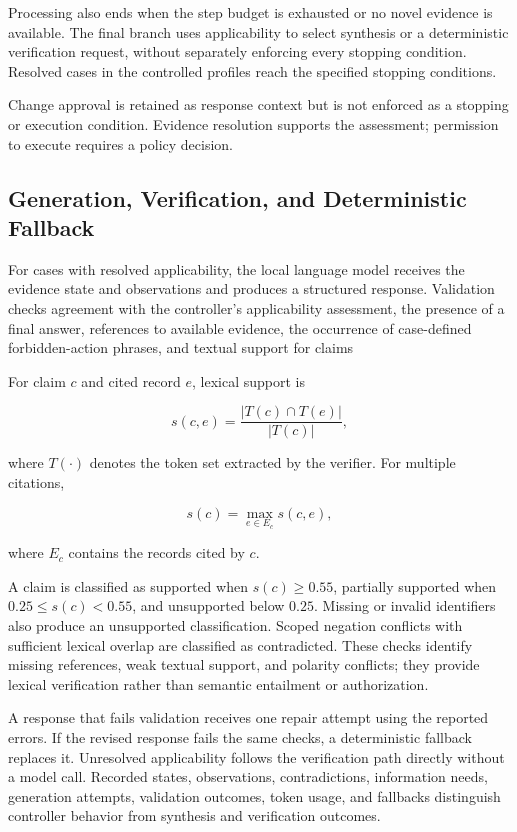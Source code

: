 \documentclass[conference]{IEEEtran}
\begin{document}
Processing also ends when the step budget is exhausted or no novel
evidence is available. The final branch uses applicability to select
synthesis or a deterministic verification request, without separately
enforcing every stopping condition. Resolved cases in the controlled
profiles reach the specified stopping conditions.

Change approval is retained as response context but is not enforced
as a stopping or execution condition. Evidence resolution supports
the assessment; permission to execute requires a policy decision.

\subsection{Generation, Verification, and Deterministic Fallback}

For cases with resolved applicability, the local language model receives the
evidence state and observations and produces a structured response. Validation checks agreement with the controller's applicability
assessment, the presence of a final answer, references to available
evidence, the occurrence of case-defined forbidden-action phrases,
and textual support for claims

For claim $c$ and cited record $e$, lexical support is

\begin{equation}
s(c,e)=
\frac{|T(c)\cap T(e)|}{|T(c)|},
\label{eq:overlap}
\end{equation}

where $T(\cdot)$ denotes the token set extracted by the verifier. For multiple citations,

\begin{equation}
s(c)=\max_{e\in E_c}s(c,e),
\label{eq:claimscore}
\end{equation}

where $E_c$ contains the records cited by $c$.

A claim is classified as supported when $s(c)\geq 0.55$, partially
supported when $0.25\leq s(c)<0.55$, and unsupported below $0.25$.
Missing or invalid identifiers also produce an unsupported
classification. Scoped negation conflicts with sufficient lexical
overlap are classified as contradicted. These checks identify missing
references, weak textual support, and polarity conflicts; they provide
lexical verification rather than semantic entailment or authorization.

A response that fails validation receives one repair attempt using the
reported errors. If the revised response fails the same checks, a deterministic
fallback replaces it. Unresolved applicability follows the verification
path directly without a model call. Recorded states, observations,
contradictions, information needs, generation attempts, validation
outcomes, token usage, and fallbacks distinguish controller behavior
from synthesis and verification outcomes.
\end{document}
